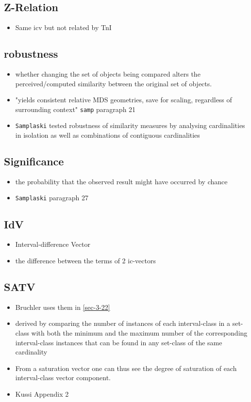 \documentclass[11pt]{article}
\begin{document}
{{\subsection{Z-Relation}
\label{sec-21-16}
\begin{itemize}
\item Same icv but not related by TnI
\end{itemize}

\subsection{robustness}
\label{sec-21-17}
\begin{itemize}
\item whether changing the set of objects being compared alters the
perceived/computed similarity between the original set of objects.
\item "yields consistent relative MDS geometries, save for scaling,
regardless of surrounding context" \texttt{samp} paragraph 21
\item \texttt{Samplaski} tested robustness of similarity measures by analysing
cardinalities in isolation as well as combinations of contiguous
cardinalities
\end{itemize}

\subsection{Significance}
\label{sec-21-18}
\begin{itemize}
\item the probability that the observed result might have occurred by
chance
\item \texttt{Samplaski} paragraph 27
\end{itemize}

\subsection{IdV}
\label{sec-21-19}
\begin{itemize}
\item Interval-difference Vector
\item the difference between the terms of 2 ic-vectors
\end{itemize}

\subsection{SATV}
\label{sec-21-20}
\begin{itemize}
\item Bruchler uses them in \ref{sec-3-22}
\item derived by comparing the number of instances of each
interval-class in a set-class with both the minimum and the
maximum number of the corresponding interval-class instances that
can be found in any set-class of the same cardinality
\item From a saturation vector one can thus see the degree of saturation
of each interval-class vector component.
\item Kussi Appendix 2
\end{itemize}

}}
\end{document}

